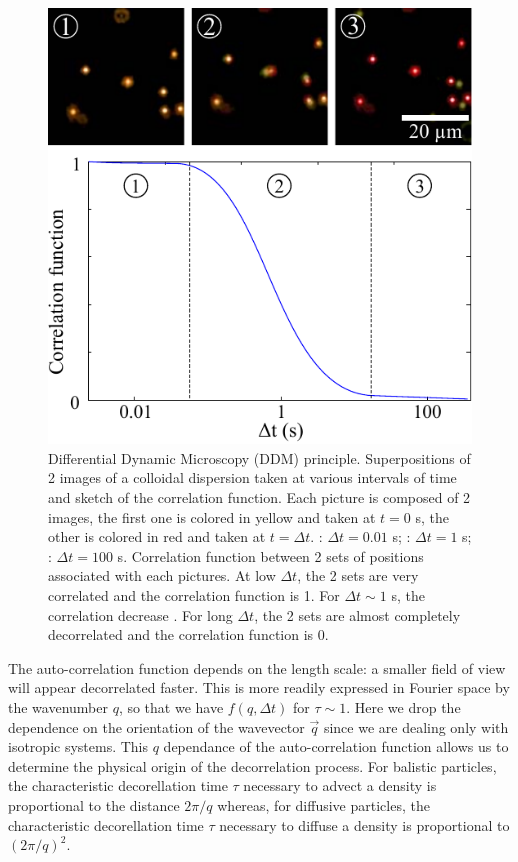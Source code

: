 \documentclass[%
 aip,
 jmp,%
 amsmath,amssymb,
reprint,%
]{revtex4-1}
\newcommand*\circled[1]{\raisebox{0.5pt}{\textcircled{\raisebox{-.9pt} {#1}}}}
\begin{document}
\begin{figure}
\includegraphics[width=\linewidth]{ComparaisonImage.pdf}
\caption{Differential Dynamic Microscopy (DDM) principle. Superpositions of 2 images of a colloidal dispersion taken at various intervals of time and sketch of the correlation function. Each picture is composed of 2 images, the first one is colored in yellow and taken at $t = 0$ s, the other is colored in red and taken at $t = \Delta t$. \protect\circled{1}: $\Delta t = 0.01$ s; \protect\circled{2}: $\Delta t = 1$ s; \protect\circled{3}: $\Delta t = 100$ s. Correlation function between 2 sets of positions associated with each pictures. At low $\Delta t$, the 2 sets are very correlated \protect\circled{1} and the correlation function is 1. For $\Delta t \sim 1$ s, the correlation decrease \protect\circled{2}. For long $\Delta t$, the 2 sets are almost completely decorrelated \protect\circled{3} and the correlation function is 0.}
\label{SketchCorrelation}
\end{figure}

The auto-correlation function depends on the length scale: a smaller field of view will appear decorrelated faster. This is more readily expressed in Fourier space by the wavenumber $q$, so that we have $f(q, \Delta t)$ for $\tau \sim 1$. Here we drop the dependence on the orientation of the wavevector $\vec{q}$ since we are dealing only with isotropic systems. This $q$ dependance of the auto-correlation function allows us to determine the physical origin of the decorrelation process. For balistic particles, the characteristic decorellation time $\tau$ necessary to advect a density is  proportional to the distance $2\pi/q$ whereas, for diffusive particles, the characteristic decorellation time $\tau$ necessary to diffuse a density is proportional to $(2\pi/q)^2$. 
\end{document}
